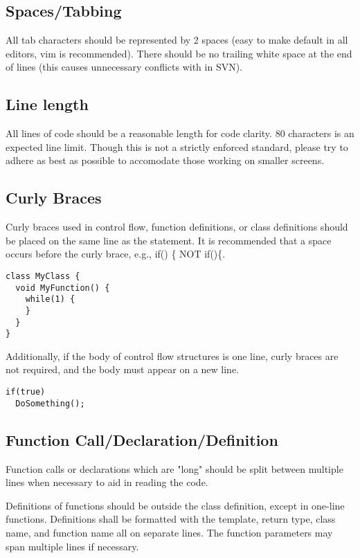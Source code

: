 \documentclass[12pt]{article}
\begin{document}
\subsection{Spaces/Tabbing}
All tab characters should be represented by 2 spaces (easy to make default in
all editors, vim is recommended). There should be no trailing white space at the
end of lines (this causes unnecessary conflicts with in SVN).

\subsection{Line length}
All lines of code should be a reasonable length for code clarity. 80 characters
is an expected line limit. Though this is not a strictly enforced standard,
please try to adhere as best as possible to accomodate those working on smaller
screens.

\subsection{Curly Braces}
Curly braces used in control flow, function definitions, or class definitions
should be placed on the same line as the statement. It is recommended that a
space occurs before the curly brace, e.g., if() \{ NOT if()\{.

\begin{lstlisting}
class MyClass {
  void MyFunction() {
    while(1) {
    }
  }
}
\end{lstlisting}

Additionally, if the body of control flow structures is one line, curly braces
are not required, and the body must appear on a new line.

\begin{lstlisting}
if(true)
  DoSomething();
\end{lstlisting}

\subsection{Function Call/Declaration/Definition}
Function calls or declarations which are "long" should be split between multiple
lines when necessary to aid in reading the code.

Definitions of functions should be outside the class definition, except in one-line
functions. Definitions shall be formatted with the template, return type, class
name, and function name all on separate lines. The function parameters may span
multiple lines if necessary.
\end{document}
